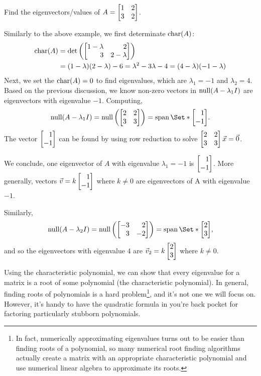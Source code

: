 \begin{example}
	Find the eigenvectors/values of $A=\mat{1&2\\3&2}$.

	Similarly to the above example, we first determinate $\operatorname{char}(A)$:
	\begin{align*}
	    \Char(A)&=\det\left(\mat{1-\lambda&2\\3&2-\lambda}\right)\\
	            &=(1-\lambda)(2-\lambda)-6=\lambda^2-3\lambda-4=(4-\lambda)(-1-\lambda)
	\end{align*}
	Next, we set the $\operatorname{char}(A)=0$ to find eigenvalues, which are $\lambda_1=-1$ and $\lambda_2=4$. Based on the previous discussion, we know non-zero vectors in $\operatorname{null}(A-\lambda_1I)$ are eigenvectors with eigenvalue $-1$. Computing, 
	\[
	\Null(A-\lambda_1I) = \Null\left(\mat{2&2\\3&3}\right)=
	\Span\Set*{\mat{1\\-1}}.
	\]
	The vector $\mat{1\\-1}$ can be found by using row reduction to solve $\mat{2&2\\3&3}\vec x=\vec 0$.
	
	We conclude, one eigenvector of $A$ with eigenvalue $\lambda_1=-1$ is $\mat{1\\-1}$. More generally, vectors $\vec v = k \mat{1\\-1}$ where $k \neq 0$ are eigenvectors of A with eigenvalue $-1$. 
	
	Similarly,
	\[
	\Null(A-\lambda_2I) = \Null\left(\mat{-3&2\\3&-2}\right)=
	\Span\Set*{\mat{2\\3}},
	\]
	and so the eigenvectors with eigenvalue $4$ are $\vec v_2 = k\mat{2\\3}$ where $k \neq 0$.
	
\end{example}

Using the characteristic polynomial, we can show that every eigenvalue
for a matrix is a root of some polynomial (the characteristic polynomial).
In general, finding roots of polynomials is a hard problem\footnote{ In fact,
numerically approximating eigenvalues turns out to be easier than finding roots
of a polynomial, so many numerical root finding algorithms actually create a matrix
with an appropriate characteristic polynomial and use numerical linear
algebra to approximate its roots.}, and it's not one we will focus on. However, it's
handy to have the quadratic formula in you're back pocket for factoring particularly
stubborn polynomials.

